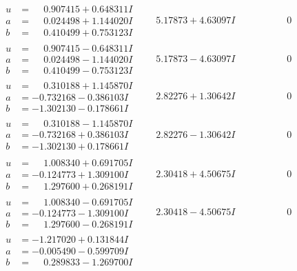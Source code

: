 \documentclass[1p]{elsarticle_modified}
\theoremstyle{definition}
\begin{document}
$$\begin{array}{c|c|c}
\begin{aligned}
u &= \phantom{-}0.907415 + 0.648311 I \\
a &= \phantom{-}0.024498 + 1.144020 I \\
b &= \phantom{-}0.410499 + 0.753123 I\end{aligned}
 & \phantom{-}5.17873 + 4.63097 I & \phantom{-0.000000 } 0 \\ \hline\begin{aligned}
u &= \phantom{-}0.907415 - 0.648311 I \\
a &= \phantom{-}0.024498 - 1.144020 I \\
b &= \phantom{-}0.410499 - 0.753123 I\end{aligned}
 & \phantom{-}5.17873 - 4.63097 I & \phantom{-0.000000 } 0 \\ \hline\begin{aligned}
u &= \phantom{-}0.310188 + 1.145870 I \\
a &= -0.732168 - 0.386103 I \\
b &= -1.302130 - 0.178661 I\end{aligned}
 & \phantom{-}2.82276 + 1.30642 I & \phantom{-0.000000 } 0 \\ \hline\begin{aligned}
u &= \phantom{-}0.310188 - 1.145870 I \\
a &= -0.732168 + 0.386103 I \\
b &= -1.302130 + 0.178661 I\end{aligned}
 & \phantom{-}2.82276 - 1.30642 I & \phantom{-0.000000 } 0 \\ \hline\begin{aligned}
u &= \phantom{-}1.008340 + 0.691705 I \\
a &= -0.124773 + 1.309100 I \\
b &= \phantom{-}1.297600 + 0.268191 I\end{aligned}
 & \phantom{-}2.30418 + 4.50675 I & \phantom{-0.000000 } 0 \\ \hline\begin{aligned}
u &= \phantom{-}1.008340 - 0.691705 I \\
a &= -0.124773 - 1.309100 I \\
b &= \phantom{-}1.297600 - 0.268191 I\end{aligned}
 & \phantom{-}2.30418 - 4.50675 I & \phantom{-0.000000 } 0 \\ \hline\begin{aligned}
u &= -1.217020 + 0.131844 I \\
a &= -0.005490 - 0.599709 I \\
b &= \phantom{-}0.289833 - 1.269700 I\end{aligned}

\end{array}$$
\end{document}
